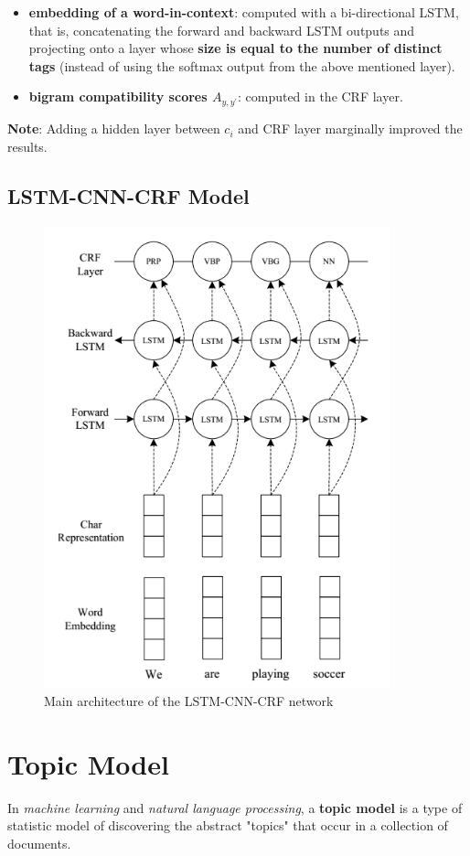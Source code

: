 \documentclass[a4paper, 12pt]{book} %
\begin{document}
\begin{itemize}
	\item \textbf{embedding of a word-in-context}: computed with a bi-directional LSTM, that is,  concatenating the forward and backward LSTM outputs and projecting onto  a layer whose \textbf{size is equal to the number of distinct tags} (instead of using the softmax output from the above mentioned layer). 
	\item \textbf{bigram compatibility scores $A_{y,y^{\prime}}$}: computed in the CRF layer.
\end{itemize}

\textbf{Note}: Adding a hidden layer between $c_i$ and CRF layer marginally improved the results.

\section{LSTM-CNN-CRF Model}
\begin{figure}[htpb]
	\centering
	\includegraphics[width=10cm]{figures/lstm_cnn_crf.png}
	\caption{Main architecture of the LSTM-CNN-CRF network}
	\label{fig:boat1}
\end{figure}

\chapter{Topic Model}
In \emph{machine learning} and \emph{natural language processing}, a \textbf{topic model} is a type of statistic model of discovering the abstract "topics" that occur in a collection of documents.
\end{document}
